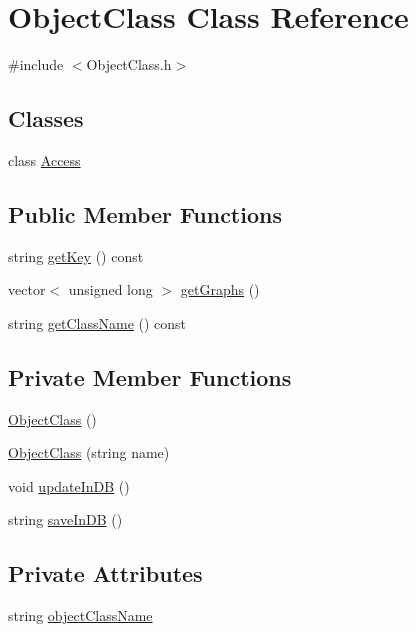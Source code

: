 \hypertarget{class_object_class}{}\section{Object\+Class Class Reference}
\label{class_object_class}


{\ttfamily \#include $<$Object\+Class.\+h$>$}

\subsection*{Classes}
\begin{DoxyCompactItemize}
\item 
class \hyperlink{class_object_class_1_1_access}{Access}
\end{DoxyCompactItemize}
\subsection*{Public Member Functions}
\begin{DoxyCompactItemize}
\item 
string \hyperlink{class_object_class_aa904f9298467d91ecc8da9163436bf05}{get\+Key} () const 
\item 
vector$<$ unsigned long $>$ \hyperlink{class_object_class_a7c653fb5b73494982a17fe1f91e80340}{get\+Graphs} ()
\item 
string \hyperlink{class_object_class_afac92dd501792911618fb3b47cf43b4c}{get\+Class\+Name} () const 
\end{DoxyCompactItemize}
\subsection*{Private Member Functions}
\begin{DoxyCompactItemize}
\item 
\hyperlink{class_object_class_a2c2fe669430058b5cb1c34b4efb2a21c}{Object\+Class} ()
\item 
\hyperlink{class_object_class_afddaf26215adce9a52ea709da54d2696}{Object\+Class} (string name)
\item 
void \hyperlink{class_object_class_a9b1ed4494db041092415ec74ef7c32f7}{update\+In\+D\+B} ()
\item 
string \hyperlink{class_object_class_afb1b4c1043ba3684931b274b3aed8286}{save\+In\+D\+B} ()
\end{DoxyCompactItemize}
\subsection*{Private Attributes}
\begin{DoxyCompactItemize}
\item 
string \hyperlink{class_object_class_a80bf1a3cbdc0e63d0da013fdfd58876d}{object\+Class\+Name}
\end{DoxyCompactItemize}
